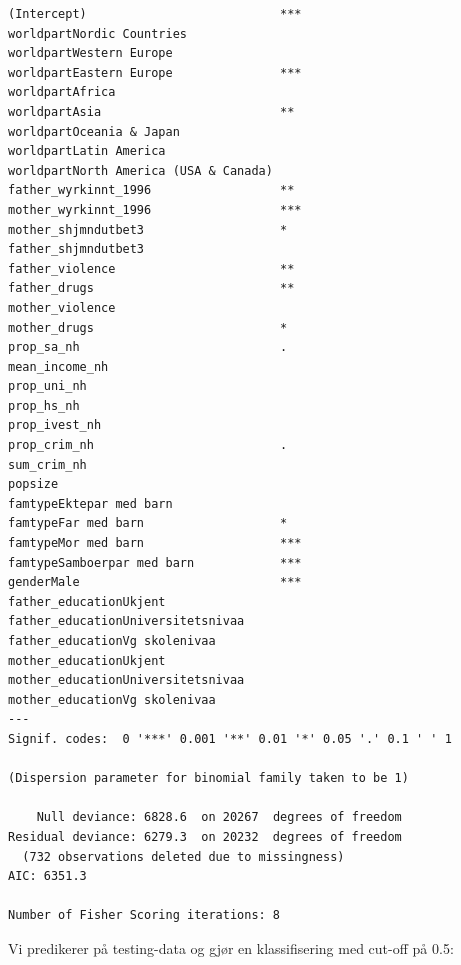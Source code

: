 \documentclass[
  letterpaper,
  DIV=11,
  numbers=noendperiod]{scrreprt}
\begin{document}
\begin{verbatim}
(Intercept)                           ***
worldpartNordic Countries                
worldpartWestern Europe                  
worldpartEastern Europe               ***
worldpartAfrica                          
worldpartAsia                         ** 
worldpartOceania & Japan                 
worldpartLatin America                   
worldpartNorth America (USA & Canada)    
father_wyrkinnt_1996                  ** 
mother_wyrkinnt_1996                  ***
mother_shjmndutbet3                   *  
father_shjmndutbet3                      
father_violence                       ** 
father_drugs                          ** 
mother_violence                          
mother_drugs                          *  
prop_sa_nh                            .  
mean_income_nh                           
prop_uni_nh                              
prop_hs_nh                               
prop_ivest_nh                            
prop_crim_nh                          .  
sum_crim_nh                              
popsize                                  
famtypeEktepar med barn                  
famtypeFar med barn                   *  
famtypeMor med barn                   ***
famtypeSamboerpar med barn            ***
genderMale                            ***
father_educationUkjent                   
father_educationUniversitetsnivaa        
father_educationVg skolenivaa            
mother_educationUkjent                   
mother_educationUniversitetsnivaa        
mother_educationVg skolenivaa            
---
Signif. codes:  0 '***' 0.001 '**' 0.01 '*' 0.05 '.' 0.1 ' ' 1

(Dispersion parameter for binomial family taken to be 1)

    Null deviance: 6828.6  on 20267  degrees of freedom
Residual deviance: 6279.3  on 20232  degrees of freedom
  (732 observations deleted due to missingness)
AIC: 6351.3

Number of Fisher Scoring iterations: 8
\end{verbatim}

Vi predikerer på testing-data og gjør en klassifisering med cut-off på
0.5:
\end{document}

